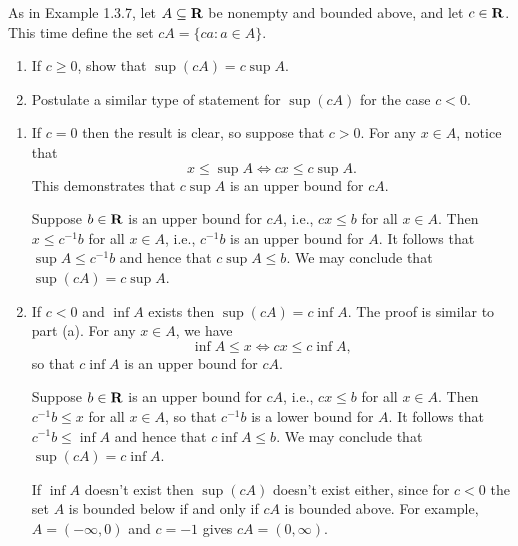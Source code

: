 \documentclass{lew98_solutions}
\begin{document}
\begin{exercise}
\label{ex:1.3.5}
    As in Example 1.3.7, let \( A \subseteq \mathbf{R} \) be nonempty and bounded above, and let \( c \in \mathbf{R} \). This time define the set \( cA = \{ ca : a \in A \} \).
    \begin{enumerate}
        \item If \( c \geq 0 \), show that \( \sup (cA) = c \sup A \).

        \item Postulate a similar type of statement for \( \sup (cA) \) for the case \( c < 0 \).
    \end{enumerate}
\end{exercise}

\begin{solution}
    \begin{enumerate}
        \item If \( c = 0 \) then the result is clear, so suppose that \( c > 0 \). For any \( x \in A \), notice that
        \[
            x \leq \sup A \iff cx \leq c \sup A.
        \]
        This demonstrates that \( c \sup A \) is an upper bound for \( cA \). 
        
        Suppose \( b \in \mathbf{R} \) is an upper bound for \( cA \), i.e., \( cx \leq b \) for all \( x \in A \). Then \( x \leq c^{-1} b \) for all \( x \in A \), i.e., \( c^{-1} b \) is an upper bound for \( A \). It follows that \( \sup A \leq c^{-1} b \) and hence that \( c \sup A \leq b \). We may conclude that \( \sup (cA) = c \sup A \).

        \item If \( c < 0 \) and \( \inf A \) exists then \( \sup (cA) = c \inf A \). The proof is similar to part (a). For any \( x \in A \), we have
        \[
            \inf A \leq x \iff cx \leq c \inf A,
        \]
        so that \( c \inf A \) is an upper bound for \( cA \).
        
        Suppose \( b \in \mathbf{R} \) is an upper bound for \( cA \), i.e., \( cx \leq b \) for all \( x \in A \). Then \( c^{-1} b \leq x \) for all \( x \in A \), so that \( c^{-1} b \) is a lower bound for \( A \). It follows that \( c^{-1} b \leq \inf A \) and hence that \( c \inf A \leq b \). We may conclude that \( \sup (cA) = c \inf A \).

        If \( \inf A \) doesn't exist then \( \sup (cA) \) doesn't exist either, since for \( c < 0 \) the set \( A \) is bounded below if and only if \( c A \) is bounded above. For example, \( A = (-\infty, 0) \) and \( c = -1 \) gives \( cA = (0, \infty) \).
    \end{enumerate}
\end{solution}
\end{document}
